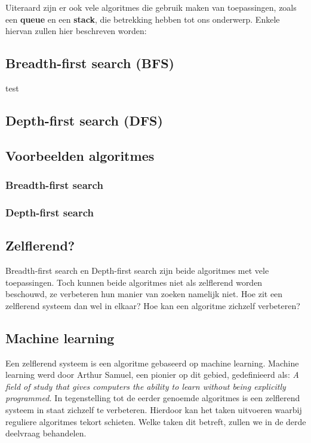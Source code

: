 Uiteraard zijn er ook vele algoritmes die gebruik maken van toepassingen, zoals een \textbf{queue} en een \textbf{stack}, die betrekking hebben tot ons onderwerp. Enkele hiervan zullen hier beschreven worden:

\subsection{Breadth-first search (BFS)}
test

\subsection{Depth-first search (DFS)}

\subsection{Voorbeelden algoritmes}

\subsubsection{Breadth-first search}

\subsubsection{Depth-first search}

\subsection{Zelflerend?}
Breadth-first search en Depth-first search zijn beide algoritmes met vele toepassingen. Toch kunnen beide algoritmes niet als zelflerend worden beschouwd, ze verbeteren hun manier van zoeken namelijk niet. Hoe zit een zelflerend systeem dan wel in elkaar? Hoe kan een algoritme zichzelf verbeteren?

\subsection{Machine learning}
Een zelflerend systeem is een algoritme gebaseerd op machine learning. Machine learning werd door Arthur Samuel, een pionier op dit gebied, gedefinieerd als: 
\textit{A field of study that gives computers the ability to learn without being explicitly programmed.} \cite{ArthurSamuel} 
In tegenstelling tot de eerder genoemde algoritmes is een zelflerend systeem in staat zichzelf te verbeteren. Hierdoor kan het taken uitvoeren waarbij reguliere algoritmes tekort schieten. Welke taken dit betreft, zullen we in de derde deelvraag behandelen. 

